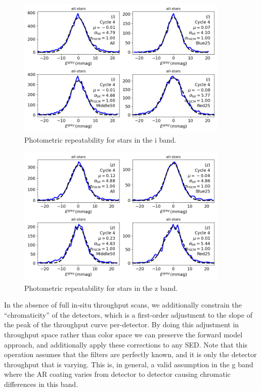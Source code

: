 \begin{figure}
  \begin{center}
    \includegraphics[width=0.9\textwidth]{photometric_calibration_figures/repeatability_i.png}
  \end{center}
  \caption{Photometric repeatability for stars in the i band.}
\end{figure}

\begin{figure}
  \begin{center}
    \includegraphics[width=0.9\textwidth]{photometric_calibration_figures/repeatability_z.png}
  \end{center}
  \caption{Photometric repeatability for stars in the z band.}
\end{figure}


In the absence of full in-situ throughput scans, we additionally constrain the
``chromaticity'' of the detectors, which is a first-order adjustment to the
slope of the peak of the throughput curve per-detector.  By doing this
adjustment in throughput space rather than color space we can preserve the
forward model approach, and additionally apply these corrections to any
SED. Note that this operation assumes that the filters are perfectly known, and
it is only the detector throughput that is varying.  This is, in general, a
valid assumption in the g band where the AR coating varies from detector to
detector causing chromatic differences in this band.

